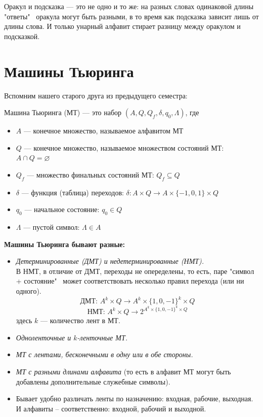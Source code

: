 \documentclass[11pt]{article}
\begin{document}
\begin{remark}
    Оракул и подсказка --- это не одно и то же: на разных словах одинаковой длины "ответы" \ оракула могут быть разными, в то время как подсказка 
    зависит лишь от длины слова. И только унарный алфавит стирает разницу между оракулом и подсказкой.
\end{remark}

\section{Машины Тьюринга}

Вспомним нашего старого друга из предыдущего семестра:

\begin{definition}
    Машина Тьюринга (МТ) — это набор $(A, Q, Q_f, \delta, q_0, \Lambda)$, где 
    \begin{itemize}
        \item $A$ --- конечное множество, называемое алфавитом МТ
        \item $Q$ --- конечное множество, называемое множеством состояний МТ: $A \cap Q = \varnothing$
        \item $Q_f$ --- множество финальных состояний МТ: $Q_f \subseteq Q$
        \item $\delta$ --- функция (таблица) переходов: $\delta: A \times Q \to A \times \{-1, 0, 1\} \times Q$
        \item $q_0$ --- начальное состояние: $q_0 \in Q$
        \item $\Lambda$ --- пустой символ: $\Lambda \in A$
    \end{itemize}
\end{definition} 

\textbf{Машины Тьюринга бывают разные:}
\begin{itemize}
    \item \textit{Детерминированные (ДМТ) и недетерминированные (НМТ).} \\ В НМТ, в отличие от ДМТ, переходы не опеределены, то есть,
    паре "символ + состояние" \ может соответствовать несколько правил перехода (или ни одного).
    \[ \text{ДМТ: } A^k \times Q \to A^k \times \{1, 0, -1\}^k \times Q\]
    \[ \text{НМТ: } A^k \times Q \to 2^{A^k \times \{1, 0, -1\}^k \times Q}\]
    здесь $k$ --- количество лент в МТ.

    \item \textit{Одноленточные и $k$-ленточные МТ.}
    
    \item \textit{МТ с лентами, бесконечными в одну или в обе стороны.}
    
    \item \textit{МТ с разными длинами алфавита} (то есть в алфавит МТ могут быть добавлены дополнительные служебные символы).
    
    \item Бывает удобно различать ленты по назначению: входная, рабочие, выходная. И алфавиты – соответственно: входной, рабочий и выходной. 
\end{itemize}
\end{document}

